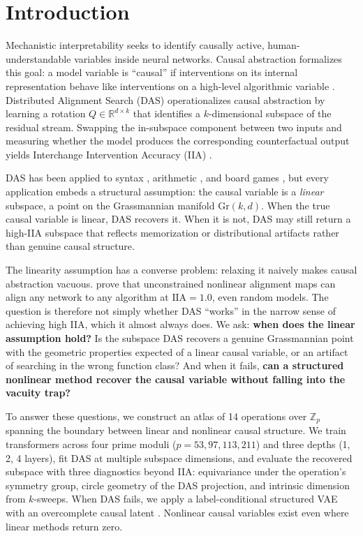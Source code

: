 \documentclass{article}
\newcommand{\Gr}{\mathrm{Gr}}
\newcommand{\IIA}{\mathrm{IIA}}
\newcommand{\R}{\mathbb{R}}
\newcommand{\Z}{\mathbb{Z}}
\begin{document}
\section{Introduction}
\label{sec:intro}

Mechanistic interpretability seeks to identify causally active,
human-understandable variables inside neural networks. Causal abstraction
formalizes this goal: a model variable is ``causal'' if interventions on its
internal representation behave like interventions on a high-level algorithmic
variable \citep{geiger2021causal}. Distributed Alignment Search (DAS)
operationalizes causal abstraction by learning a rotation $Q \in \R^{d \times k}$
that identifies a $k$-dimensional subspace of the residual stream. Swapping the
in-subspace component between two inputs and measuring whether the model
produces the corresponding counterfactual output yields Interchange Intervention
Accuracy (IIA) \citep{geiger2023finding}.

DAS has been applied to syntax \citep{geiger2023finding}, arithmetic
\citep{wu2024interpretability}, and board games \citep{li2023emergent}, but
every application embeds a structural assumption: the causal variable is a \emph{linear} subspace, a point on the Grassmannian
manifold $\Gr(k,d)$. When
the true causal variable is linear, DAS recovers it. When it is not, DAS may
still return a high-IIA subspace that reflects memorization or distributional
artifacts rather than genuine causal structure.

The linearity assumption has a converse problem: relaxing it naively makes
causal abstraction vacuous. \citet{sutter2025nonlinear} prove that
unconstrained nonlinear alignment maps can align any network to any algorithm
at $\IIA = 1.0$, even random models. The question is therefore not simply
whether DAS ``works'' in the narrow sense of achieving high IIA, which it almost always does. We ask: \textbf{when does the linear assumption hold?} Is the
subspace DAS recovers a genuine Grassmannian point with the geometric
properties expected of a linear causal variable, or an artifact of searching
in the wrong function class? And when it fails, \textbf{can a structured
nonlinear method recover the causal variable without falling into the
vacuity trap?}

To answer these questions, we construct an atlas of 14 operations over $\Z_p$
spanning the boundary between linear and nonlinear causal structure. We train
transformers across four prime moduli ($p = 53, 97, 113, 211$) and three
depths (1, 2, 4 layers), fit DAS at multiple subspace dimensions, and
evaluate the recovered subspace with three diagnostics beyond IIA:
equivariance under the operation's symmetry group, circle geometry of the DAS
projection, and intrinsic dimension from $k$-sweeps. When DAS fails, we apply a label-conditional structured VAE with an overcomplete causal latent
\citep{narayanaswamy2017learning}. Nonlinear causal variables exist even where
linear methods return zero.
\end{document}
